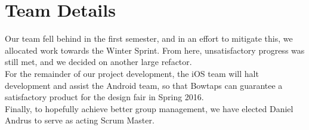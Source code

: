 \documentclass[11pt]{article}
\begin{document}
	
\section*{Team Details}
Our team fell behind in the first semester, and in an effort to mitigate this, we allocated work towards the Winter Sprint. From here, unsatisfactory progress was still met, and we decided on another large refactor.\\

For the remainder of our project development, the iOS team will halt development and assist the Android team, so that Bowtaps can guarantee a satisfactory product for the design fair in Spring 2016.\\

Finally, to hopefully achieve better group management, we have elected Daniel Andrus to serve as acting Scrum Master.
\end{document}
